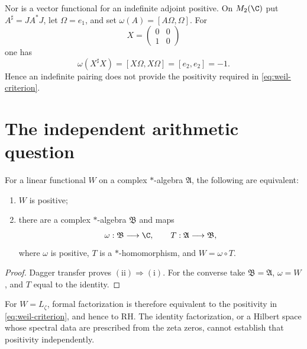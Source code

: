 Nor is a vector functional for an indefinite adjoint positive.  On
$M_2(\C)$ put $A^\sharp=JA^*J$, let $\Omega=e_1$, and set
$\omega(A)=[A\Omega,\Omega]$.  For
\[
 X=\begin{pmatrix}0&0\\1&0\end{pmatrix}
\]
one has
\begin{equation}
 \omega(X^\sharp X)=[X\Omega,X\Omega]=[e_2,e_2]=-1.
 \label{eq:indefinite-negative}
\end{equation}
Hence an indefinite pairing does not provide the positivity required in
\eqref{eq:weil-criterion}.

\section{The independent arithmetic question}

\begin{proposition}
For a linear functional $W$ on a complex $*$-algebra $\mathfrak A$, the
following are equivalent:
\begin{enumerate}
\item $W$ is positive;
\item there are a complex $*$-algebra $\mathfrak B$ and maps
\[
 \omega:\mathfrak B\longrightarrow\C,
 \qquad T:\mathfrak A\longrightarrow\mathfrak B,
\]
where $\omega$ is positive, $T$ is a $*$-homomorphism, and
$W=\omega\circ T$.
\end{enumerate}
\end{proposition}

\begin{proof}
Dagger transfer proves $(\mathrm{ii})\Rightarrow(\mathrm{i})$.  For the converse take
$\mathfrak B=\mathfrak A$, $\omega=W$, and $T$ equal to the identity.
\end{proof}

For $W=L_\zeta$, formal factorization is therefore equivalent to the
positivity in \eqref{eq:weil-criterion}, and hence to RH.  The identity
factorization, or a Hilbert space whose spectral data are prescribed from
the zeta zeros, cannot establish that positivity independently.

